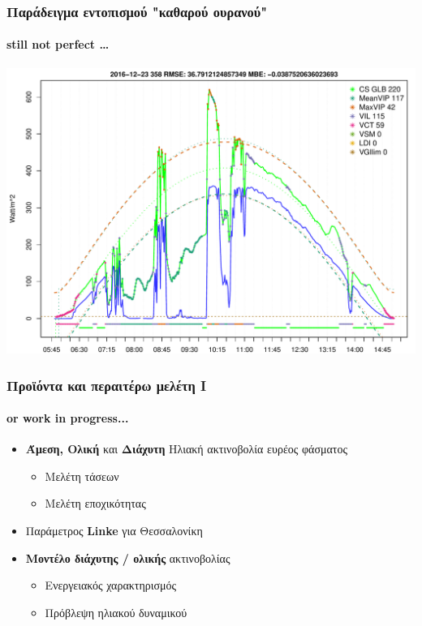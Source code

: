 \documentclass[hyperref={pdfpagelabels=false}]{beamer}
\begin{document}
\begin{frame}%
\frametitle{Παράδειγμα εντοπισμού "καθαρού ουρανού"}
\framesubtitle{still not perfect \ldots}
\begin{center}
    \includegraphics[width=.92\textwidth]{files/CS_827.pdf}
\end{center}
\end{frame}






\begin{frame}%
\frametitle{Προϊόντα και περαιτέρω μελέτη I}
\framesubtitle{or work in progress...}

    \begin{itemize}
         \item <1->\textbf{Άμεση, Ολική} και \textbf{Διάχυτη} Ηλιακή ακτινοβολία ευρέος φάσματος
         \begin{itemize}
             \item Μελέτη τάσεων
             \item Μελέτη εποχικότητας
         \end{itemize}
         \item <2->Παράμετρος \textbf{Linke} για Θεσσαλονίκη
         \item <3->\textbf{Μοντέλο διάχυτης / ολικής} ακτινοβολίας
            \begin{itemize}
                \item Ενεργειακός χαρακτηρισμός
                \item Πρόβλεψη ηλιακού δυναμικού
            \end{itemize}
            \end{itemize}
\end{frame}
\end{document}
